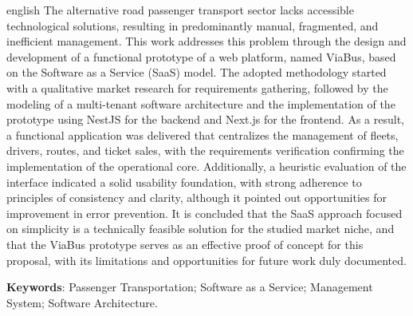 \begin{resumo}[Abstract]    %
  \begin{otherlanguage*}{english}  %
  The alternative road passenger transport sector lacks accessible technological solutions, resulting in predominantly manual, fragmented, and inefficient management. This work addresses this problem through the design and development of a functional prototype of a web platform, named ViaBus, based on the Software as a Service (SaaS) model. The adopted methodology started with a qualitative market research for requirements gathering, followed by the modeling of a multi-tenant software architecture and the implementation of the prototype using NestJS for the backend and Next.js for the frontend. As a result, a functional application was delivered that centralizes the management of fleets, drivers, routes, and ticket sales, with the requirements verification confirming the implementation of the operational core. Additionally, a heuristic evaluation of the interface indicated a solid usability foundation, with strong adherence to principles of consistency and clarity, although it pointed out opportunities for improvement in error prevention. It is concluded that the SaaS approach focused on simplicity is a technically feasible solution for the studied market niche, and that the ViaBus prototype serves as an effective proof of concept for this proposal, with its limitations and opportunities for future work duly documented.
  
  \vspace{\onelineskip}
  \noindent
  \textbf{Keywords}: Passenger Transportation; Software as a Service; Management System; Software Architecture.
  \end{otherlanguage*}
  \end{resumo}